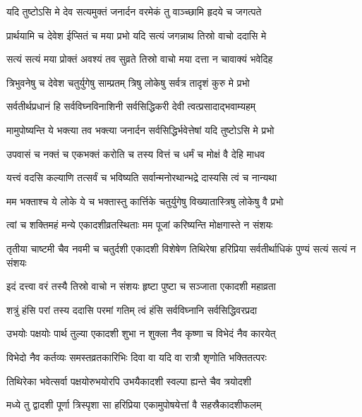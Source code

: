 \twolineshloka
{यदि तुष्टोऽसि मे देव सत्यमुक्तं जनार्दन}
{वरमेकं तु वाञ्च्छामि हृदये च जगत्पते}%

\twolineshloka
{प्रार्थयामि च देवेश ईप्सितं च मया प्रभो}
{यदि सत्यं जगन्नाथ तिस्रो वाचो ददासि मे}%


\twolineshloka
{सत्यं सत्यं मया प्रोक्तं अवश्यं तव सुव्रते}
{तिस्रो वाचो मया दत्ता न चावाक्यं भवेदिह}%


\twolineshloka
{त्रिभुवनेषु च देवेश चतुर्युगेषु साम्प्रतम्}
{त्रिषु लोकेषु सर्वत्र तादृशं कुरु मे प्रभो}%

\twolineshloka
{सर्वतीर्थप्रधानं हि सर्वविघ्नविनाशिनी}
{सर्वसिद्धिकरी देवी त्वत्प्रसादाद्भवाम्यहम्}%

\twolineshloka
{मामुपोष्यन्ति ये भक्त्या तव भक्त्या जनार्दन}
{सर्वसिद्धिर्भवेत्तेषां यदि तुष्टोऽसि मे प्रभो}%

\twolineshloka
{उपवासं च नक्तं च एकभक्तं करोति च}
{तस्य वित्तं च धर्मं च मोक्षं वै देहि माधव}%


\twolineshloka
{यत्त्वं वदसि कल्याणि तत्सर्वं च भविष्यति}
{सर्वान्मनोरथान्भद्रे दास्यसि त्वं च नान्यथा}%

\twolineshloka
{मम भक्ताश्च ये लोके ये च भक्तास्तु कार्त्तिके}
{चतुर्युगेषु विख्यातास्त्रिषु लोकेषु वै प्रभो}%

\twolineshloka
{त्वां च शक्तिमहं मन्ये एकादशीव्रतस्थिताः}
{मम पूजां करिष्यन्ति मोक्षगास्ते न संशयः}%

\threelineshloka
{तृतीया चाष्टमी चैव नवमी च चतुर्दशी}
{एकादशी विशेषेण तिथिरेषा हरिप्रिया}
{सर्वतीर्थाधिकं पुण्यं सत्यं सत्यं न संशयः}%

\twolineshloka
{इदं दत्त्वा वरं तस्यै तिस्रो वाचो न संशयः}
{हृष्टा पुष्टा च सञ्जाता एकादशी महाव्रता}%

\twolineshloka
{शत्रुं हंसि परां तस्य ददासि परमां गतिम्}
{त्वं हंसि सर्वविघ्नानि सर्वसिद्धिवरप्रदा}%

\twolineshloka
{उभयोः पक्षयोः पार्थ तुल्या एकादशी शुभा}
{न शुक्ला नैव कृष्णा च विभेदं नैव कारयेत्}%

\twolineshloka
{विभेदो नैव कर्तव्यः समस्तव्रतकारिभिः}
{दिवा वा यदि वा रात्रौ शृणोति भक्तितत्परः}%

\twolineshloka
{तिथिरेका भवेत्सर्वा पक्षयोरुभयोरपि}
{उभयैकादशी स्वल्पा ह्यन्ते चैव त्रयोदशी}%

\twolineshloka
{मध्ये तु द्वादशी पूर्णा त्रिस्पृशा सा हरिप्रिया}
{एकामुपोषयेत्तां वै सहस्रैकादशीफलम्}%

